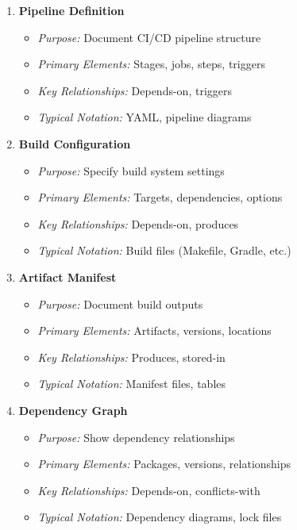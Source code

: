 \documentclass[11pt,letterpaper]{article}
\begin{document}
\begin{enumerate}[label=\textbf{MT\arabic*:}, leftmargin=2.5em]
    \item \textbf{Pipeline Definition}
    \begin{itemize}[nosep]
        \item \textit{Purpose:} Document CI/CD pipeline structure
        \item \textit{Primary Elements:} Stages, jobs, steps, triggers
        \item \textit{Key Relationships:} Depends-on, triggers
        \item \textit{Typical Notation:} YAML, pipeline diagrams
    \end{itemize}
    
    \item \textbf{Build Configuration}
    \begin{itemize}[nosep]
        \item \textit{Purpose:} Specify build system settings
        \item \textit{Primary Elements:} Targets, dependencies, options
        \item \textit{Key Relationships:} Depends-on, produces
        \item \textit{Typical Notation:} Build files (Makefile, Gradle, etc.)
    \end{itemize}
    
    \item \textbf{Artifact Manifest}
    \begin{itemize}[nosep]
        \item \textit{Purpose:} Document build outputs
        \item \textit{Primary Elements:} Artifacts, versions, locations
        \item \textit{Key Relationships:} Produces, stored-in
        \item \textit{Typical Notation:} Manifest files, tables
    \end{itemize}
    
    \item \textbf{Dependency Graph}
    \begin{itemize}[nosep]
        \item \textit{Purpose:} Show dependency relationships
        \item \textit{Primary Elements:} Packages, versions, relationships
        \item \textit{Key Relationships:} Depends-on, conflicts-with
        \item \textit{Typical Notation:} Dependency diagrams, lock files
    \end{itemize}
    

\end{enumerate}
\end{document}
